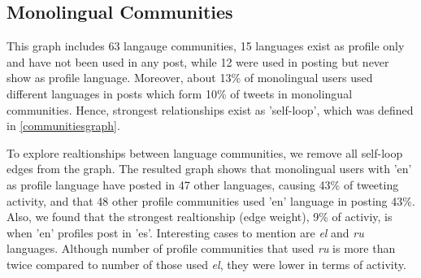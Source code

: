 \documentclass{llncs}
\begin{document}

\subsection{Monolingual Communities}

This graph includes 63 langauge communities, 15 languages exist as profile only and
have not been used in any post, while 12 were used in posting but never show as profile
language. Moreover, about 13\% of monolingual users used different languages
in posts which form 10\% of tweets in monolingual communities. Hence, strongest
relationships exist as 'self-loop', which was defined in \ref{communitiesgraph}.

To explore realtionships between language communities, we remove all self-loop 
edges from the graph. The resulted graph shows that monolingual users with 'en' as 
profile language have posted in 47 other languages, causing 43\%
of tweeting activity, and that 48 other profile communities used 'en' language
in posting 43\%. Also, we found that the strongest realtionship (edge weight),
9\% of activiy, is when 'en' profiles post in 'es'. Interesting cases to mention are
\emph{el} and \emph{ru} languages. Although number of profile communities that used \emph{ru}
is more than twice compared to number of those used \emph{el}, they were lower in
terms of activity.

\end{document}
